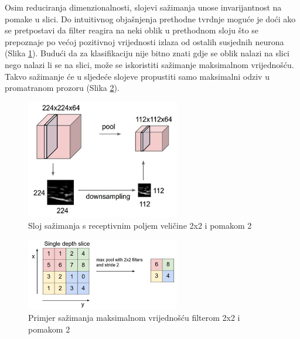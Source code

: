 \documentclass[times, utf8, proizvoljni, numeric]{fer}
\begin{document}
Osim reduciranja dimenzionalnosti, slojevi sažimanja unose invarijantnost na pomake u slici. Do intuitivnog objašnjenja prethodne tvrdnje moguće je doći ako se pretpostavi da filter reagira na neki oblik u prethodnom sloju što se prepoznaje po većoj pozitivnoj vrijednosti izlaza od ostalih susjednih neurona (Slika \ref{fg:sazimanje}). Budući da za klasifikaciju nije bitno znati gdje se oblik nalazi na slici nego nalazi li se na slici, može se iskoristiti sažimanje maksimalnom vrijednošću. Takvo sažimanje će u sljedeće slojeve propustiti samo maksimalni odziv u promatranom prozoru (Slika \ref{fg:sazimanje2}).

\begin{figure}[H]
	\begin{center}
		\captionsetup{justification=centering}
		\includegraphics[width=0.6\textwidth]{./imgs/sazimanje.png}
		\caption{Sloj sažimanja s receptivnim poljem veličine 2x2 i pomakom 2 \cite{CS231n}}
		\label{fg:sazimanje}
	\end{center}
\end{figure}


\begin{figure}[H]
	\begin{center}
		\captionsetup{justification=centering}
		\includegraphics[width=0.6\textwidth]{./imgs/sazimanje2.png}
		\caption{Primjer sažimanja maksimalnom vrijednošću filterom 2x2 i pomakom 2 \cite{CS231n}}
		\label{fg:sazimanje2}
	\end{center}
\end{figure}
\end{document}
